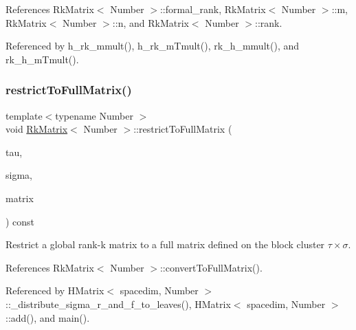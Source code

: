 References Rk\+Matrix$<$ Number $>$\+::formal\+\_\+rank, Rk\+Matrix$<$ Number $>$\+::m, Rk\+Matrix$<$ Number $>$\+::n, and Rk\+Matrix$<$ Number $>$\+::rank.



Referenced by h\+\_\+rk\+\_\+mmult(), h\+\_\+rk\+\_\+m\+Tmult(), rk\+\_\+h\+\_\+mmult(), and rk\+\_\+h\+\_\+m\+Tmult().

\mbox{\label{classRkMatrix_a5305306386e47bcded819ce8d7f7935c}} 
\subsubsection{\texorpdfstring{restrict\+To\+Full\+Matrix()}{restrictToFullMatrix()}\hspace{0.1cm}{\footnotesize\ttfamily [1/2]}}
{\footnotesize\ttfamily template$<$typename Number $>$ \\
void \hyperlink{classRkMatrix}{Rk\+Matrix}$<$ Number $>$\+::restrict\+To\+Full\+Matrix (\begin{DoxyParamCaption}\item[{const std\+::vector$<$ types\+::global\+\_\+dof\+\_\+index $>$ \&}]{tau,  }\item[{const std\+::vector$<$ types\+::global\+\_\+dof\+\_\+index $>$ \&}]{sigma,  }\item[{\hyperlink{classLAPACKFullMatrixExt}{L\+A\+P\+A\+C\+K\+Full\+Matrix\+Ext}$<$ Number $>$ \&}]{matrix }\end{DoxyParamCaption}) const}

Restrict a global rank-\/k matrix to a full matrix defined on the block cluster $\tau \times \sigma$. 

References Rk\+Matrix$<$ Number $>$\+::convert\+To\+Full\+Matrix().



Referenced by H\+Matrix$<$ spacedim, Number $>$\+::\+\_\+distribute\+\_\+sigma\+\_\+r\+\_\+and\+\_\+f\+\_\+to\+\_\+leaves(), H\+Matrix$<$ spacedim, Number $>$\+::add(), and main().

\mbox{\label{classRkMatrix_a0c529b22a8a38c4046a93c4a16ad39ca}} 
